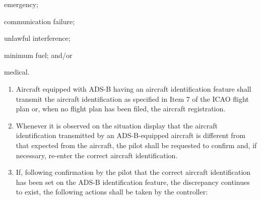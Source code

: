 \begin{noteev}
    \begin{enumalph}
        \item emergency;
        \item communication failure;
        \item unlawful interference;
        \item minimum fuel; and/or
        \item medical.
    \end{enumalph}
\end{noteev}

\begin{enumerate}
    \item Aircraft equipped with ADS-B having an aircraft identification feature shall transmit the aircraft identification as specified in Item 7 of the ICAO flight plan or, when no flight plan has been filed, the aircraft registration.
    \item Whenever it is observed on the situation display that the aircraft identification transmitted by an ADS-B-equipped aircraft is different from that expected from the aircraft, the pilot shall be requested to confirm and, if necessary, re-enter the correct aircraft identification.
    \item If, following confirmation by the pilot that the correct aircraft identification has been set on the ADS-B identification feature, the discrepancy continues to exist, the following actions shall be taken by the controller:

\end{enumerate}

